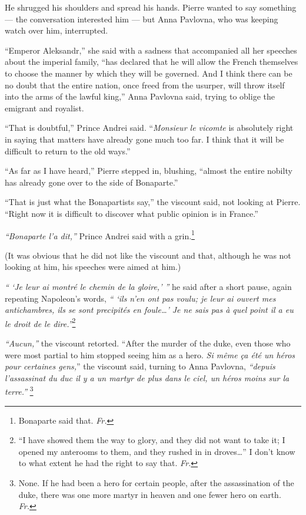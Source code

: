 He shrugged his shoulders and spread his hands. Pierre wanted to say something --- the conversation interested him --- but Anna Pavlovna, who was keeping watch over him, interrupted.

``Emperor Aleksandr,'' she said with a sadness that accompanied all her speeches about the imperial family, ``has declared that he will allow the French themselves to choose the manner by which they will be governed. And I think there can be no doubt that the entire nation, once freed from the usurper, will throw itself into the arms of the lawful king,'' Anna Pavlovna said, trying to oblige the emigrant and royalist. %

``That is doubtful,'' Prince Andrei said. ``\textit{Monsieur le vicomte} is absolutely right in saying that matters have already gone much too far. I think that it will be difficult to return to the old ways.'' %

``As far as I have heard,'' Pierre stepped in, blushing, ``almost the entire nobilty has already gone over to the side of Bonaparte.'' %

``That is just what the Bonapartists say,'' the viscount said, not looking at Pierre. ``Right now it is difficult to discover what public opinion is in France.'' %

\textit{``Bonaparte l'a dit,''} Prince Andrei said with a grin.\footnote{Bonaparte said that. \textit{Fr.}} %

(It was obvious that he did not like the viscount and that, although he was not looking at him, his speeches were aimed at him.)

\textit{`` `Je leur ai montr\'e le chemin de la gloire,' ''} he said after a short pause, again repeating Napoleon's words, \textit{`` `ils n'en ont pas voulu; je leur ai ouvert mes antichambres, ils se sont precipit\'es en foule\ldots{}' Je ne sais pas \`a quel point il a eu le droit de le dire.''}\footnote{``I have showed them the way to glory, and they did not want to take it; I opened my anterooms to them, and they rushed in in droves\ldots{}'' I don't know to what extent he had the right to say that. \textit{Fr.}} %
	
\textit{``Aucun,''} the viscount retorted. ``After the murder of the duke, even those who were most partial to him stopped seeing him as a hero. \textit{Si m\^eme \c ca \'et\'e un h\'eros pour certaines gens,}'' the viscount said, turning to Anna Pavlovna, \textit{``depuis l'assassinat du duc il y a un martyr de plus dans le ciel, un h\'eros moins sur la terre.''} \footnote{None. If he had been a hero for certain people, after the assassination of the duke, there was one more martyr in heaven and one fewer hero on earth. \textit{Fr.}} %

